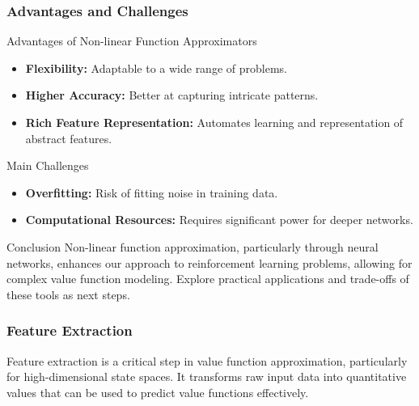 \documentclass[aspectratio=169]{beamer}
\begin{document}
\begin{frame}[fragile]
    \frametitle{Advantages and Challenges}

    \begin{block}{Advantages of Non-linear Function Approximators}
        \begin{itemize}
            \item \textbf{Flexibility:} Adaptable to a wide range of problems.
            \item \textbf{Higher Accuracy:} Better at capturing intricate patterns.
            \item \textbf{Rich Feature Representation:} Automates learning and representation of abstract features.
        \end{itemize}
    \end{block}

    \begin{block}{Main Challenges}
        \begin{itemize}
            \item \textbf{Overfitting:} Risk of fitting noise in training data.
            \item \textbf{Computational Resources:} Requires significant power for deeper networks.
        \end{itemize}
    \end{block}
    
    \begin{block}{Conclusion}
        Non-linear function approximation, particularly through neural networks, enhances our approach to reinforcement learning problems, allowing for complex value function modeling. Explore practical applications and trade-offs of these tools as next steps.
    \end{block}
\end{frame}

\begin{frame}[fragile]
  \frametitle{Feature Extraction}
  
  Feature extraction is a critical step in value function approximation, particularly for high-dimensional state spaces. 
  It transforms raw input data into quantitative values that can be used to predict value functions effectively.
\end{frame}
\end{document}
